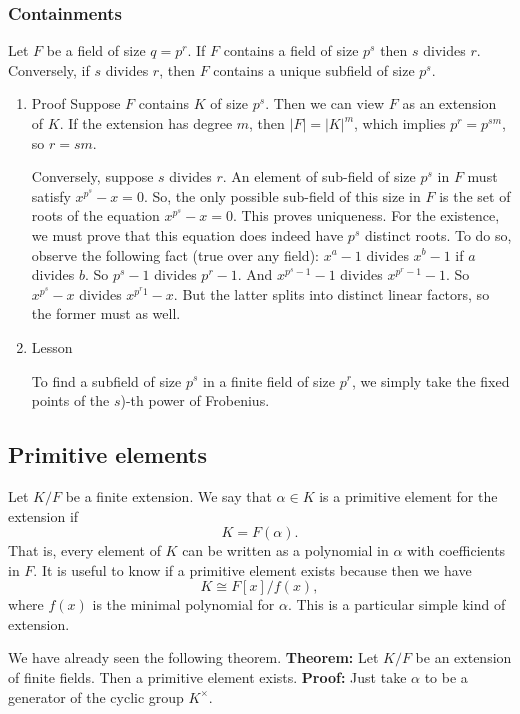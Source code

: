 \documentclass[11pt]{article}
\begin{document}
\subsubsection{Containments}
\label{sec:org654f187}
Let \(F\) be a field of size \(q = p^{r}\).
If \(F\) contains a field of size \(p^{s}\) then \(s\) divides \(r\).
Conversely, if \(s\) divides \(r\), then \(F\) contains a unique subfield of size \(p^{s}\).
\begin{enumerate}
\item Proof
\label{sec:orgd31e2d1}
Suppose \(F\) contains \(K\) of size \(p^{s}\).
Then we can view \(F\) as an extension of \(K\).
If the extension has degree \(m\), then \(|F| = |K|^m\), which implies \(p^r = p^{sm}\), so \(r = sm\).

Conversely, suppose \(s\) divides \(r\).
An element of sub-field of size \(p^s\) in \(F\) must satisfy \(x^{p^s}-x = 0\).
So, the only possible sub-field of this size in \(F\) is the set of roots of the equation \(x^{p^s}-x = 0\).
This proves uniqueness.
For the existence, we must prove that this equation does indeed have \(p^s\) distinct roots.
To do so, observe the following fact (true over any field): \(x^a-1\) divides \(x^{b}-1\) if \(a\) divides \(b\).
So \(p^{s}-1\) divides \(p^{r}-1\).
And \(x^{p^s-1}-1\) divides \(x^{p^r-1}-1\).
So \(x^{p^s}-x\) divides \(x^{p^r1}-x\).
But the latter splits into distinct linear factors, so the former must as well.
\item Lesson
\label{sec:org0ca3191}

To find a subfield of size \(p^{s}\) in a finite field of size \(p^r\), we simply take the fixed points of the \(s\))-th power of Frobenius.
\end{enumerate}
\subsection{Primitive elements}
\label{sec:org68dcf38}
Let \(K/F\) be a finite extension.
We say that \(\alpha \in K\) is a primitive element for the extension if
\[ K = F(\alpha).\]
That is, every element of \(K\) can be written as a polynomial in \(\alpha\) with coefficients in \(F\).
It is useful to know if a primitive element exists because then we have
\[ K \cong F[x]/f(x),\]
where \(f(x)\) is the minimal polynomial for \(\alpha\).
This is a particular simple kind of extension.

We have already seen the following theorem.
\textbf{\textbf{Theorem:}} Let \(K/F\) be an extension of finite fields.  Then a primitive element exists.
\textbf{\textbf{Proof:}} Just take \(\alpha\) to be a generator of the cyclic group \(K^{\times}\).
\end{document}
